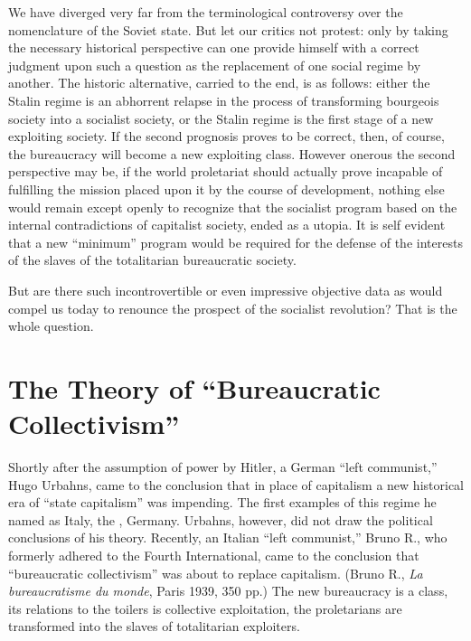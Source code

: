 We have diverged very far from the terminological controversy over the nomenclature of the Soviet state. But let our critics not protest: only by taking the necessary historical perspective can one provide himself with a correct judgment upon such a question as the replacement of one social regime by another. The historic alternative, carried to the end, is as follows: either the Stalin regime is an abhorrent relapse in the process of transforming bourgeois society into a socialist society, or the Stalin regime is the first stage of a new exploiting society. If the second prognosis proves to be correct, then, of course, the bureaucracy will become a new exploiting class. However onerous the second perspective may be, if the world proletariat should actually prove incapable of fulfilling the mission placed upon it by the course of development, nothing else would remain except openly to recognize that the socialist program based on the internal contradictions of capitalist society, ended as a utopia. It is self evident that a new “minimum” program would be required for the defense of the interests of the slaves of the totalitarian bureaucratic society.

\enlargethispage{\baselineskip}
But are there such incontrovertible or even impressive objective data as would compel us today to renounce the prospect of the socialist revolution? That is the whole question.

\section*{The Theory of “Bureaucratic Collectivism”}

Shortly after the assumption of power by Hitler, a German “left communist,” Hugo Urbahns, came to the conclusion that in place of capitalism a new historical era of “state capitalism” was impending. The first examples of this regime he named as Italy, the \USSR, Germany. Urbahns, however, did not draw the political conclusions of his theory. Recently, an Italian “left communist,” Bruno R., who formerly adhered to the Fourth International, came to the conclusion that “bureaucratic collectivism” was about to replace capitalism. (Bruno R., \emph{La bureaucratisme du monde}, Paris 1939, 350 pp.) The new bureaucracy is a class, its relations to the toilers is collective exploitation, the proletarians are transformed into the slaves of totalitarian exploiters.

